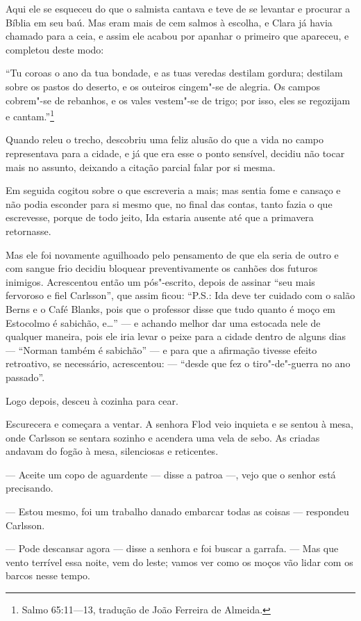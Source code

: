 Aqui ele se esqueceu do que o salmista cantava e teve de se levantar e procurar
a Bíblia em seu baú. Mas eram mais de cem salmos à escolha, e Clara já
havia chamado para a ceia, e assim ele acabou por apanhar o primeiro que
apareceu, e completou deste modo:

 ``Tu coroas o ano da tua bondade, e as tuas veredas destilam gordura;
destilam sobre os pastos do deserto, e os outeiros cingem"-se de alegria.
Os campos cobrem"-se de rebanhos, e os vales vestem"-se de trigo; 
por isso, eles se regozijam e cantam.''\footnote{ Salmo 65:11---13, tradução 
de João Ferreira de Almeida.}

Quando releu o trecho, descobriu uma feliz alusão do que a vida no campo
representava para a cidade, e já que era esse o ponto sensível, decidiu não
tocar mais no assunto, deixando a citação parcial falar por si mesma.

Em seguida cogitou sobre o que escreveria a mais; mas sentia fome e cansaço e
não podia esconder para si mesmo que, no final das contas, tanto fazia o que
escrevesse, porque de todo jeito, Ida estaria ausente até que a primavera
retornasse.

Mas ele foi novamente aguilhoado pelo pensamento de que ela seria de outro e
com sangue frio decidiu bloquear preventivamente os canhões dos futuros
inimigos. Acrescentou então um pós"-escrito, depois de assinar “seu mais
fervoroso e fiel Carlsson”, que assim ficou: ``P.S.: Ida deve ter cuidado com o salão
Berns e o Café Blanks, pois que o professor disse que tudo quanto é moço em
Estocolmo é sabichão, e\ldots{}'' --- e achando melhor dar uma estocada nele de
qualquer maneira, pois ele iria levar o peixe para a cidade dentro de alguns
dias --- ``Norman também é sabichão'' --- e para que a afirmação tivesse efeito
retroativo, se necessário, acrescentou: --- ``desde que fez o tiro"-de"-guerra
no ano passado''.

Logo depois, desceu à cozinha para cear.

Escurecera e começara a ventar. A senhora Flod veio inquieta e se sentou à
mesa, onde Carlsson se sentara sozinho e acendera uma vela de sebo. As criadas
andavam do fogão à mesa, silenciosas e reticentes.

--- Aceite um copo de aguardente --- disse a patroa ---, vejo que o senhor está
precisando.

--- Estou mesmo, foi um trabalho danado embarcar todas as coisas --- respondeu Carlsson.

--- Pode descansar agora --- disse a senhora e foi buscar a garrafa. --- Mas que
vento terrível essa noite, vem do leste; vamos ver como os moços vão lidar com
os barcos nesse tempo.

